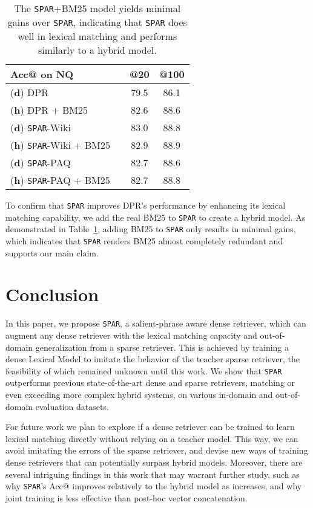 \documentclass[11pt]{article}
\newcommand{\spar}{\texttt{SPAR}\xspace}
\newcommand{\lexmodel}{Lexical Model}
\newcommand{\lexmodelsymbol}{\xspace}
\begin{document}
\begin{table}[ht]
    \small
    \centering
    \begin{tabular}{l c cc}
    \toprule
    Acc@ on NQ        && @20 & @100 \\
    \midrule
    ({\bf d}) DPR     && 79.5 & 86.1 \\
    ({\bf h}) DPR + BM25    && 82.6 & 88.6 \\
    \midrule
    ({\bf d}) \spar{}-Wiki     && 83.0 & 88.8 \\
    ({\bf h}) \spar{}-Wiki + BM25 && 82.9 & 88.9 \\
    \midrule
    ({\bf d}) \spar{}-PAQ     && 82.7 & 88.6 \\
    ({\bf h}) \spar{}-PAQ + BM25 && 82.7 & 88.8 \\
    \bottomrule
    \end{tabular}
    \caption{The \spar{}+BM25 model yields minimal gains over \spar{}, indicating that \spar{} does well in lexical matching and performs similarly to a hybrid model.}
    \label{tab:spar_hybrid}
\end{table} 
To confirm that \spar{} improves DPR's performance by enhancing its lexical matching capability, we add the real BM25 to \spar{} to create a hybrid model.
As demonstrated in Table~\ref{tab:spar_hybrid}, adding BM25 to \spar{} only results in minimal gains, which indicates that \spar{} renders BM25 almost completely redundant and supports our main claim.


 
\section{Conclusion}\label{sec:conclusion}

In this paper, we propose \spar{}, a salient-phrase aware dense retriever, which can augment any dense retriever with the lexical matching capacity and out-of-domain generalization from a sparse retriever.
This is achieved by training a dense \lexmodel{} \lexmodelsymbol{} to imitate the behavior of the teacher sparse retriever, the feasibility of which remained unknown until this work.
We show that \spar{} outperforms previous state-of-the-art dense and sparse retrievers, matching or even exceeding more complex hybrid systems, on various in-domain and out-of-domain evaluation datasets.

For future work we plan to explore if a dense retriever can be trained to learn lexical matching directly without relying on a teacher model.
This way, we can avoid imitating the errors of the sparse retriever, and devise new ways of training dense retrievers that can potentially surpass hybrid models.
Moreover, there are several intriguing findings in this work that may warrant further study, such as why \spar{}'s Acc@ improves relatively to the hybrid model as  increases, and why joint training is less effective than post-hoc vector concatenation. 
\end{document}
